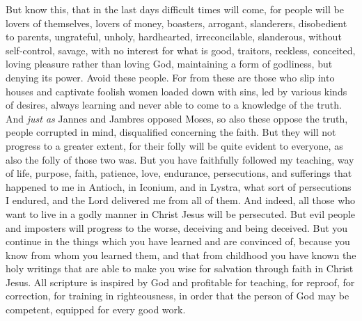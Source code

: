 \begin{biblechapter} %
 But know this, that in the last days difficult times will come,
\verse for people will be lovers of themselves, lovers of money, boasters, arrogant, slanderers, disobedient to parents, ungrateful, unholy,
\verse hardhearted, irreconcilable, slanderous, without self-control, savage, with no interest for what is good,
\verse traitors, reckless, conceited, loving pleasure rather than loving God,
\verse maintaining a form of godliness, but denying its power. Avoid these people.
\verse For from these are those who slip into houses and captivate foolish women loaded down with sins, led by various kinds of desires,
\verse always learning and never able to come to a knowledge of the truth.
\verse And \textit{just as} Jannes and Jambres opposed Moses, so also these oppose the truth, people corrupted in mind, disqualified concerning the faith.
\verse But they will not progress to a greater extent, for their folly will be quite evident to everyone, as also the folly of those two was.
 But you have faithfully followed my teaching, way of life, purpose, faith, patience, love, endurance,
\verse persecutions, and sufferings that happened to me in Antioch, in Iconium, and in Lystra, what sort of persecutions I endured, and the Lord delivered me from all of them.
\verse And indeed, all those who want to live in a godly manner in Christ Jesus will be persecuted.
\verse But evil people and imposters will progress to the worse, deceiving and being deceived.
\verse But you continue in the things which you have learned and are convinced of, because you know from whom you learned them,
\verse and that from childhood you have known the holy writings that are able to make you wise for salvation through faith in Christ Jesus.
\verse All scripture is inspired by God and profitable for teaching, for reproof, for correction, for training in righteousness,
\verse in order that the person of God may be competent, equipped for every good work.
\end{biblechapter}


